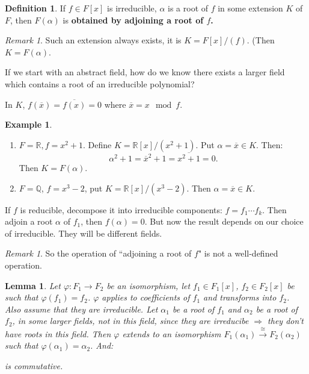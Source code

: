 \documentclass[9pt,reqno,twoside]{amsbook}
\theoremstyle{plain}
\numberwithin{section}{chapter}
\numberwithin{equation}{chapter}
\newtheorem{lem}[theorem]{Lemma}
\theoremstyle{definition}
\newtheorem{Def}[theorem]{Definition}
\newtheorem{Ex}[theorem]{Example}
\theoremstyle{remark}
\newtheorem{rem}[theorem]{Remark}
\theoremstyle{plain}
\newcommand{\R}{\mathbb{R}}
\newcommand{\Q}{\mathbb{Q}}
\renewcommand{\bar}{\overline}%
\renewcommand{\phi}{\varphi}
\begin{document}
\begin{Def}
If $f \in F[x]$ is irreducible, $\alpha$ is a root of $f$ in some extension $K$ of $F$, then $F(\alpha)$ is \textbf{obtained by adjoining a root of $f$. }
\end{Def}

\begin{rem}
Such an extension always exists, it is $K = F[x]/(f)$. (Then $K = F(\alpha)$. 
\end{rem}

If we start with an abstract field, how do we know there exists a larger field which contains a root of an irreducible polynomial?

In $K$, $f(\bar{x}) = \bar{f(x)} = 0$ where $\bar{x} = x \mod f$. 


\begin{Ex}
\begin{enumerate}

\item 
$F = \R, f = x^2 + 1$. Define $K = \R[x]/(x^2 + 1)$. Put $\alpha = \bar{x} \in K$. Then:
$$\alpha^2 + 1 = \bar{x}^2 + 1  = \bar{x^2 + 1} = 0.
$$
Then $K = F(\alpha)$. 
\item $F = \Q$, $f = x^3 - 2$, put $K = \R[x]/(x^3 - 2)$. Then $\alpha = \bar{x} \in K$. 

\end{enumerate}
\end{Ex}

If $f$ is reducible, decompose it into irreducible components: $f = f_1\cdots f_k$. Then adjoin a root $\alpha$ of $f_1$, then $f(\alpha) = 0$. But now the result depends on our choice of irreducible. They will be different fields. 

\begin{rem}
So the operation of ``adjoining a root of $f$" is not a well-defined operation. 
\end{rem}

\begin{lem}
Let $\phi:F_1 \to F_2$ be an isomorphism, let $f_1 \in F_1[x]$, $f_2 \in F_2[x]$ be such that $\phi(f_1) = f_2$. $\phi$ applies to coefficients of $f_1$ and transforms into $f_2$. Also assume that they are irreducible. Let $\alpha_1$ be a root of $f_1$ and $\alpha_2$ be a root of $f_2$, in some larger fields, not in this field, since they are irreducibe $\Rightarrow$ they don't have roots in \textit{this} field. Then $\phi$ extends to an isomorphism $F_1(\alpha_1) \overset{\cong}{\to} F_2(\alpha_2)$ such that $\phi(\alpha_1) = \alpha_2$. And:
\begin{center}
\end{center}
is commutative. 
\end{lem}
\end{document}

